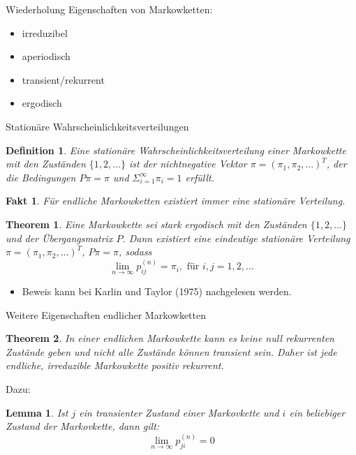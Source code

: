 \documentclass{beamer}
\newtheorem{defi}{Definition}
\newtheorem{thm}{Theorem}
\newtheorem{lmm}{Lemma}
\newtheorem{fct}{Fakt}
\begin{document}
\begin{frame}{Wiederholung}
  Eigenschaften von Markowketten:
  \begin{itemize}
  \item irreduzibel
  \item aperiodisch
  \item transient/rekurrent
  \item ergodisch
  \end{itemize}
\end{frame}
\begin{frame}{Stationäre Wahrscheinlichkeitsverteilungen}
  \begin{defi}
    Eine stationäre Wahrscheinlichkeitsverteilung einer Markowkette mit den Zuständen $\{1,2,...\}$   ist der nichtnegative Vektor $π = (π_1,π_2,...)^T$, der die Bedingungen $Pπ = π$ und $Σ_{i=1}^∞π_i = 1$ erfüllt.
  \end{defi}
  \begin{fct}
    Für endliche Markowketten existiert immer eine stationäre Verteilung.
  \end{fct}
\end{frame}
\begin{frame}
  \begin{thm}
    Eine Markowkette sei stark ergodisch mit den Zuständen
    $\{1,2,\dots\}$ und der Übergangsmatrix $P$. Dann existiert eine
    eindeutige stationäre Verteilung $π = (π_1,π_2,\dots)^T$, $Pπ = π$,
    sodass
    \[
      \lim_{n →∞}p_{ij}^{(n)} = π_i, \text{ für } i,j=1,2,\dots
    \]
  \end{thm}
  \begin{itemize}
    \item Beweis kann bei Karlin und Taylor (1975) nachgelesen werden.
  \end{itemize}
\end{frame}
\begin{frame}{Weitere Eigenschaften endlicher Markowketten}
  \begin{thm}
    In einer endlichen Markowkette kann es keine
    null rekurrenten Zustände geben und nicht alle Zustände
    können transient sein. Daher ist jede endliche, irreduzible Markowkette positiv
    rekurrent.  
  \end{thm}
  Dazu:
  \begin{lmm}
    Ist $j$ ein transienter Zustand einer Markovkette und $i$ ein
    beliebiger Zustand der Markovkette, dann gilt:
    \[
      \lim_{n→∞} p_{ji}^{(n)} = 0
    \]
  \end{lmm}
\end{frame}
\end{document}
